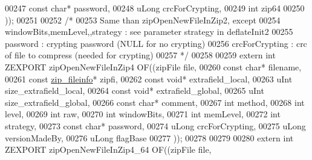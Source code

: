\begin{DoxyCode}
00247                                             \textcolor{keyword}{const} \textcolor{keywordtype}{char}* password,
00248                                             uLong crcForCrypting,
00249                                             \textcolor{keywordtype}{int} zip64
00250                                             ));
00251 
00252 \textcolor{comment}{/*}
00253 \textcolor{comment}{  Same than zipOpenNewFileInZip2, except}
00254 \textcolor{comment}{    windowBits,memLevel,,strategy : see parameter strategy in deflateInit2}
00255 \textcolor{comment}{    password : crypting password (NULL for no crypting)}
00256 \textcolor{comment}{    crcForCrypting : crc of file to compress (needed for crypting)}
00257 \textcolor{comment}{ */}
00258 
00259 \textcolor{keyword}{extern} \textcolor{keywordtype}{int} ZEXPORT zipOpenNewFileInZip4 OF((zipFile file,
00260                                             \textcolor{keyword}{const} \textcolor{keywordtype}{char}* filename,
00261                                             \textcolor{keyword}{const} \hyperlink{structzip__fileinfo}{zip\_fileinfo}* zipfi,
00262                                             \textcolor{keyword}{const} \textcolor{keywordtype}{void}* extrafield\_local,
00263                                             uInt size\_extrafield\_local,
00264                                             \textcolor{keyword}{const} \textcolor{keywordtype}{void}* extrafield\_global,
00265                                             uInt size\_extrafield\_global,
00266                                             \textcolor{keyword}{const} \textcolor{keywordtype}{char}* comment,
00267                                             \textcolor{keywordtype}{int} method,
00268                                             \textcolor{keywordtype}{int} level,
00269                                             \textcolor{keywordtype}{int} raw,
00270                                             \textcolor{keywordtype}{int} windowBits,
00271                                             \textcolor{keywordtype}{int} memLevel,
00272                                             \textcolor{keywordtype}{int} strategy,
00273                                             \textcolor{keyword}{const} \textcolor{keywordtype}{char}* password,
00274                                             uLong crcForCrypting,
00275                                             uLong versionMadeBy,
00276                                             uLong flagBase
00277                                             ));
00278 
00279 
00280 \textcolor{keyword}{extern} \textcolor{keywordtype}{int} ZEXPORT zipOpenNewFileInZip4\_64 OF((zipFile file,

\end{DoxyCode}
